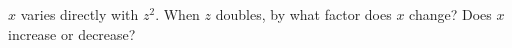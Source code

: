 $x$ varies directly with $z^2$. When $z$ doubles, by what factor does $x$ change? Does $x$ increase or decrease?
